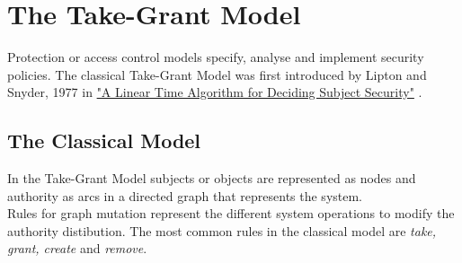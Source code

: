 \section{The Take-Grant Model}	
Protection or access control models specify, analyse and implement security policies. 
The classical Take-Grant Model was first introduced by Lipton and Snyder, 1977 in  \href{https://www.cs.nmt.edu/~doshin/t/s06/cs589/pub/2.JLS-TG.pdf}{%
"A Linear Time Algorithm for Deciding Subject Security"} \cite{1TG}.
\subsection{The Classical Model}
In the Take-Grant Model \cite{TakeG} subjects or objects are represented as nodes and authority as arcs in a directed graph that represents the system. \\ 
Rules for graph mutation represent the different system operations to modify  the authority distibution. 
The most common rules in the classical model are \textit{take, grant, create} and \textit{remove}. 
	
